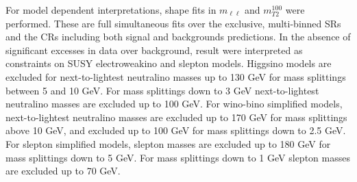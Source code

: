 For model dependent interpretations, shape fits in $m_{\ell\ell}$ and $m_{T2}^{100}$ were performed.  These are full simultaneous fits over the exclusive, multi-binned SRs and the CRs including both signal and backgrounds predictions.  In the absence of significant excesses in data over background, result were interpreted as constraints on SUSY electroweakino and slepton models.  Higgsino models are excluded for next-to-lightest neutralino masses up to 130 GeV for mass splittings between 5 and 10 GeV. For mass splittings down to 3 GeV next-to-lightest neutralino masses are excluded up to 100 GeV.  For wino-bino simplified models, next-to-lightest neutralino masses are excluded up to 170 GeV for mass splittings above 10 GeV, and excluded up to 100 GeV for mass splittings down to 2.5 GeV.  For slepton simplified models, slepton masses are excluded up to 180 GeV for mass splittings down to 5 GeV. For mass splittings down to 1 GeV slepton masses are excluded up to 70 GeV.


